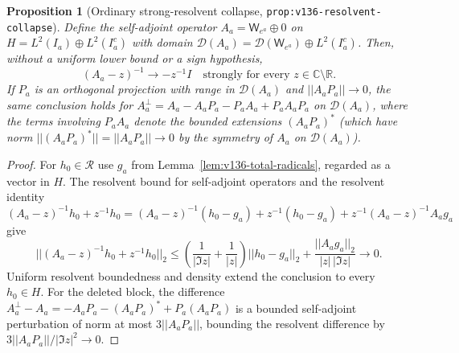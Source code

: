 \documentclass[11pt]{article}
\def\norm#1{||#1||}%
\newtheorem{proposition}[theorem]{Proposition}
\theoremstyle{remark}
\newcommand{\norm}[1]{\left\lVert #1\right\rVert}
\begin{document}
\begin{proposition}[Ordinary strong-resolvent collapse, \texttt{prop:v136-resolvent-collapse}]
\label{prop:v136-resolvent-collapse}
Define the self-adjoint operator $A_a = \mathsf{W}_{e^a} \oplus 0$ on $H = L^2(I_a) \oplus L^2(I_a^c)$ with domain $\mathcal{D}(A_a) = \mathcal{D}(\mathsf{W}_{e^a}) \oplus L^2(I_a^c)$. Then, without a uniform lower bound or a sign hypothesis,
\begin{equation}\label{eq:v136-resolvent-collapse}
  (A_a - z)^{-1} \longrightarrow -z^{-1}I \quad \text{strongly for every } z \in \mathbb{C} \setminus \mathbb{R}.
\end{equation}
If $P_a$ is an orthogonal projection with range in $\mathcal{D}(A_a)$ and $\norm{A_a P_a} \to 0$, the same conclusion holds for $A_a^\perp = A_a - A_a P_a - P_a A_a + P_a A_a P_a$ on $\mathcal{D}(A_a)$, where the terms involving $P_a A_a$ denote the bounded extensions $(A_a P_a)^*$ (which have norm $\norm{(A_a P_a)^*} = \norm{A_a P_a} \to 0$ by the symmetry of $A_a$ on $\mathcal{D}(A_a)$).
\end{proposition}
\begin{proof}
For $h_0 \in \mathcal{R}$ use $g_a$ from Lemma~\ref{lem:v136-total-radicals}, regarded as a vector in $H$. The resolvent bound for self-adjoint operators and the resolvent identity $(A_a - z)^{-1}h_0 + z^{-1}h_0 = (A_a - z)^{-1}(h_0 - g_a) + z^{-1}(h_0 - g_a) + z^{-1}(A_a - z)^{-1}A_a g_a$ give
\[
  \norm{(A_a - z)^{-1}h_0 + z^{-1}h_0}_2 \le \left(\frac{1}{|\Im z|} + \frac{1}{|z|}\right)\norm{h_0 - g_a}_2 + \frac{\norm{A_a g_a}_2}{|z|\,|\Im z|} \longrightarrow 0.
\]
Uniform resolvent boundedness and density extend the conclusion to every $h_0 \in H$. For the deleted block, the difference $A_a^\perp - A_a = -A_a P_a - (A_a P_a)^* + P_a(A_a P_a)$ is a bounded self-adjoint perturbation of norm at most $3\norm{A_a P_a}$, bounding the resolvent difference by $3\norm{A_a P_a}/|\Im z|^2 \to 0$.
\end{proof}
\end{document}
